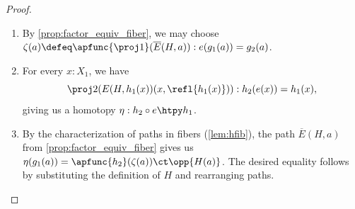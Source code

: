 \begin{proof}
\begin{enumerate}
\item By \cref{prop:factor_equiv_fiber}, we may choose
  $\zeta(a) \defeq \apfunc{\proj1}(\overline E(H,a)) : e(g_1(a)) = g_2(a)$.
  \label{item:orth-fact-2}
\item For every $x:X_1$, we have
\begin{equation*}
\proj2(E(H,h_1(x))({x,\refl{h_1(x)}})) :h_2(e(x))= h_1(x),
\end{equation*}
giving us a homotopy $\eta:h_2\circ e\htpy h_1$.
\item By the characterization of paths in fibers (\cref{lem:hfib}), the path $\overline E(H,a)$ from \cref{prop:factor_equiv_fiber} gives us
  $\eta(g_1(a)) = \apfunc{h_2}(\zeta(a)) \ct \opp{H(a)}$.
  The desired equality follows by substituting the definition of $H$ and rearranging paths.\qedhere
\end{enumerate}
\end{proof}
